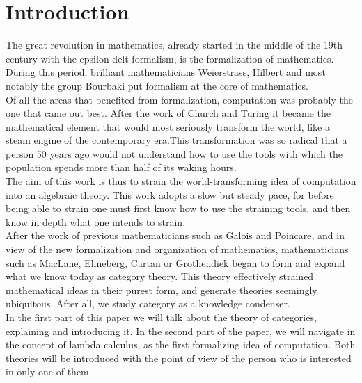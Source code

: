 
\chapter{Introduction}


The great revolution in mathematics, already started in the middle of the 19th century with the epsilon-delt formalism, is the formalization of mathematics. During this period, brilliant mathematicians Weierstrass, Hilbert and most notably the group  Bourbaki put formalism at the core of mathematics. \\

Of all the areas that benefited from formalization, computation was probably the one that came out best. After the work of Church and Turing it became the mathematical element that would most seriously transform the world, like a steam engine of the contemporary era.This transformation was so radical that a person 50 years ago would not understand how to use the tools with which the population spends more than half of its waking hours.\\

The aim of this work is thus to strain the world-transforming idea of computation into an algebraic theory. This work  adopts a slow but steady pace, for before being able to strain one must first know how to use the straining tools, and then know in depth what one intends to strain.  \\

After the work of previous mathematicians such as Galois and Poincare, and in view of the new formalization and organization of mathematics, mathematicians such as MacLane, Elineberg, Cartan or Grothendiek began to form and expand what we know today as category theory. This theory effectively strained mathematical ideas in their purest form, and generate theories seemingly ubiquitous. After all, we study category as a knowledge condenser.\\

In the first part of this paper we will talk about the theory of categories, explaining and introducing it. In the second part of the paper, we will navigate in the concept of lambda calculus, as the first formalizing idea of computation. Both theories will be introduced with the point of view of the person who is interested in only one of them.\\

